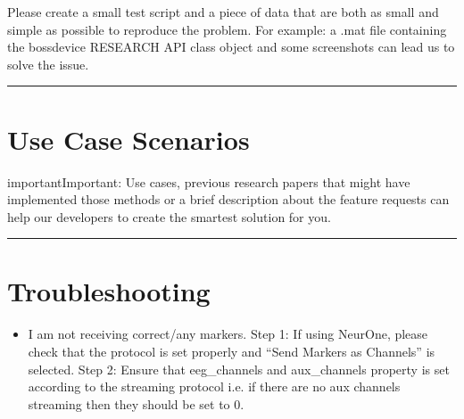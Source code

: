 \documentclass[letterpaper,10pt,english]{sphinxmanual}
\begin{document}
\sphinxAtStartPar
Please create a small test script and a piece of data that are both as small and simple as possible to reproduce the problem. For example: a .mat file containing the bossdevice RESEARCH API class object and some screenshots can lead us to solve the issue.


\bigskip\hrule\bigskip



\section{Use Case Scenarios}
\label{\detokenize{7_issues_bugs_requests:use-case-scenarios}}
\begin{sphinxadmonition}{important}{Important:}
\sphinxAtStartPar
Use cases, previous research papers that might have implemented those methods or a brief description about the feature requests can help our developers to create the smartest solution for you.
\end{sphinxadmonition}


\bigskip\hrule\bigskip



\section{Troubleshooting}
\label{\detokenize{7_issues_bugs_requests:troubleshooting}}\begin{itemize}
\item {} 
\sphinxAtStartPar
I am not receiving correct/any markers.
\sphinxhyphen{}  Step 1: If using NeurOne, please check that the protocol is set properly and “Send Markers as Channels” is selected.
\sphinxhyphen{}  Step 2: Ensure that eeg\_channels and aux\_channels property is set according to the streaming protocol i.e. if there are no aux channels streaming then they should be set to 0.

\end{itemize}



\renewcommand{\indexname}{Index}
\printindex
\end{document}

